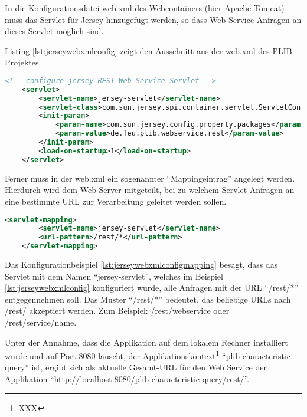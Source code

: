 In die Konfigurationsdatei web.xml des Webcontainers (hier \gls{Apache Tomcat}) muss das Servlet für \gls{Jersey} hinzugefügt werden, so dass \gls{Web Service} Anfragen an dieses Servlet möglich sind. 

Listing \ref{lst:jerseywebxmlconfig} zeigt den Ausschnitt aus der web.xml des \gls{PLIB}-Projektes. 

 \begin{lstlisting}[caption=Jersey Servlet Konfiguration in web.xml, language=XML, label=lst:jerseywebxmlconfig]
 <!-- configure jersey REST-Web Service Servlet -->
    <servlet>
        <servlet-name>jersey-servlet</servlet-name>
        <servlet-class>com.sun.jersey.spi.container.servlet.ServletContainer</servlet-class>
        <init-param>
            <param-name>com.sun.jersey.config.property.packages</param-name>
            <param-value>de.feu.plib.webservice.rest</param-value>
        </init-param>
        <load-on-startup>1</load-on-startup>
    </servlet>
 \end{lstlisting}   
 
Ferner muss in der web.xml ein sogenannter \enquote{Mappingeintrag} angelegt werden. Hierdurch wird dem Web Server mitgeteilt, bei zu welchem Servlet Anfragen an eine bestimmte URL zur Verarbeitung geleitet werden sollen. 
 
  \begin{lstlisting}[caption=Jersey Servlet Mappingkonfiguration in web.xml, language=XML, label=lst:jerseywebxmlconfigmapping]
    <servlet-mapping>
        <servlet-name>jersey-servlet</servlet-name>
        <url-pattern>/rest/*</url-pattern>
    </servlet-mapping>
 \end{lstlisting}  
 
Das Konfigurationbeispiel  \ref{lst:jerseywebxmlconfigmapping}  besagt, dass das Servlet mit dem Namen \enquote{jersey-servlet}, welches im Beispiel \ref{lst:jerseywebxmlconfig}  konfiguriert wurde, alle Anfragen mit der URL \enquote{/rest/*} entgegennehmen soll. Das Muster \enquote{/rest/*} bedeutet, das beliebige URLs nach /rest/ akzeptiert werden. Zum Beispiel: /rest/webservice oder /rest/service/name.

Unter der Annahme, dass die Applikation auf dem lokalem Rechner installiert wurde und auf Port 8080 lauscht, der Applikationskontext\footnote{XXX} \enquote{plib-characteristic-query} ist, ergibt sich als aktuelle Gesamt-URL für den Web Service der Applikation \enquote{http://localhost:8080/plib-characteristic-query/rest/}.

